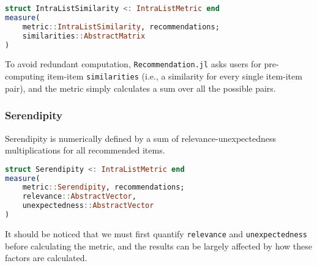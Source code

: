 \begin{lstlisting}[language = Julia]
struct IntraListSimilarity <: IntraListMetric end
measure(
    metric::IntraListSimilarity, recommendations;
    similarities::AbstractMatrix
)
\end{lstlisting}

To avoid redundant computation, \texttt{Recommendation.jl} asks users for pre-computing item-item \texttt{similarities} (i.e., a similarity for every single item-item pair), and the metric simply calculates a sum over all the possible pairs.

\subsubsection{Serendipity}

Serendipity is numerically defined by a sum of relevance-unexpectedness multiplications for all recommended items.

\begin{lstlisting}[language = Julia]
struct Serendipity <: IntraListMetric end
measure(
    metric::Serendipity, recommendations;
    relevance::AbstractVector, 
    unexpectedness::AbstractVector
)
\end{lstlisting}

It should be noticed that we must first quantify \texttt{relevance} and \texttt{unexpectedness} before calculating the metric, and the results can be largely affected by how these factors are calculated.
